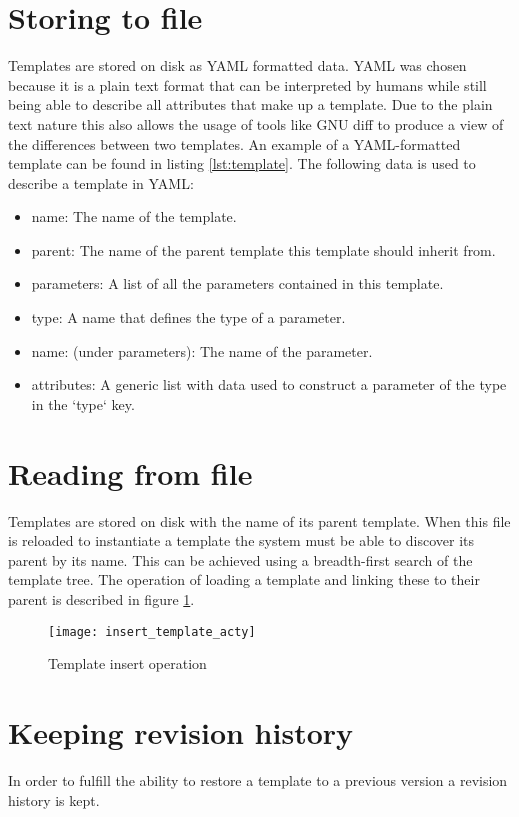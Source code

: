 \section{Storing to file}
Templates are stored on disk as YAML formatted data. YAML was chosen because it is a plain text format that can be interpreted by humans while still being able to describe all attributes that make up a template. 
Due to the plain text nature this also allows the usage of tools like GNU diff to produce a view of the differences between two templates.
An example of a YAML-formatted template can be found in listing \ref{lst:template}.
The following data is used to describe a template in YAML:
\begin{itemize}
	\item name: The name of the template.
	\item parent: The name of the parent template this template should inherit from.
	\item parameters: A list of all the parameters contained in this template.
	\item type: A name that defines the type of a parameter.
	\item name: (under parameters): The name of the parameter.
	\item attributes: A generic list with data used to construct a parameter of the type in the `type` key.
\end{itemize}


\section{Reading from file}
Templates are stored on disk with the name of its parent template.
When this file is reloaded to instantiate a template the system must be able to discover its
parent by its name. This can be achieved using a breadth-first search of the template tree.
The operation of loading a template and linking these to their parent is described in figure \ref{fig:inserttemplate}.

\begin{figure}[h!]
	\centering
	\texttt{[image: insert\_template\_acty]}
	\caption{Template insert operation}
	\label{fig:inserttemplate}
\end{figure}

\section{Keeping revision history}
In order to fulfill the ability to restore a template to a previous version a revision history is kept.


